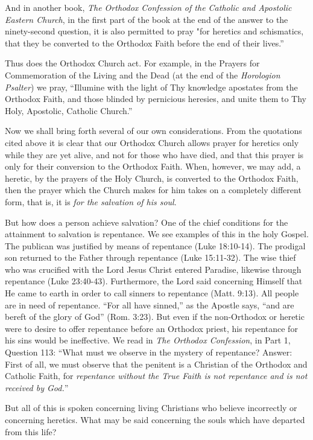 And in another book, \textit{The Orthodox Confession of the Catholic and Apostolic Eastern Church}, in the first part of the book at the end of the answer to the ninety-second question, it is also permitted to pray "for heretics and schismatics, that they be converted to the Orthodox Faith before the end of their lives.”

Thus does the Orthodox Church act. For example, in the Prayers for Commemoration of the Living and the Dead (at the end of the \textit{Horologion Psalter}) we pray, “Illumine with the light of Thy knowledge apostates from the Orthodox Faith, and those blinded by pernicious heresies, and unite them to Thy Holy, Apostolic, Catholic Church.”

Now we shall bring forth several of our own considerations. From the quotations cited above it is clear that our Orthodox Church allows prayer for heretics only while they are yet alive, and not for those who have died, and that this prayer is only for their conversion to the Orthodox Faith. When, however, we may add, a heretic, by the prayers of the Holy Church, is converted to the Orthodox Faith, then the prayer which the Church makes for him takes on a completely different form, that is, it is \textit{for the salvation of his soul}.

But how does a person achieve salvation? One of the chief conditions for the attainment to salvation is repentance. We see examples of this in the holy Gospel. The publican was justified by means of repentance (Luke 18:10-14). The prodigal son returned to the Father through repentance (Luke 15:11-32). The wise thief who was crucified with the Lord Jesus Christ entered Paradise, likewise through repentance (Luke 23:40-43). Furthermore, the Lord said concerning Himself that He came to earth in order to call sinners to repentance (Matt. 9:13). All people are in need of repentance. “For all have sinned,” as the Apostle says, “and are bereft of the glory of God” (Rom. 3:23). But even if the non-Orthodox or heretic were to desire to offer repentance before an Orthodox priest, his repentance for his sins would be ineffective. We read in \textit{The Orthodox Confession}, in Part 1, Question 113: “What must we observe in the mystery of repentance? Answer: First of all, we must observe that the penitent is a Christian of the Orthodox and Catholic Faith, for \textit{repentance without the True Faith is not repentance and is not received by God.}”

But all of this is spoken concerning living Christians who believe incorrectly or concerning heretics. What may be said concerning the souls which have departed from this life?

